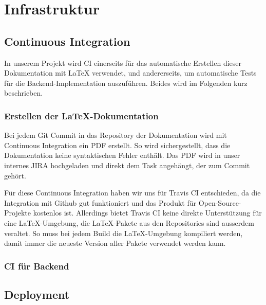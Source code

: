 
\section{Infrastruktur}
\label{Infrastruktur}

\subsection{Continuous Integration}
\label{Infrastruktur:Continuous Integration}

In unserem Projekt wird \ac{CI} einerseits für das automatische Erstellen dieser Dokumentation mit LaTeX verwendet, und andererseits, um automatische Tests für die Backend-Implementation auszuführen. Beides wird im Folgenden kurz beschrieben.

\subsubsection{Erstellen der LaTeX-Dokumentation}
\label{CI:Erstellen der LaTeX-Dokumentation}

Bei jedem Git Commit in das Repository der Dokumentation \cite{github:thesis} wird mit Continuous Integration ein PDF erstellt. So wird sichergestellt, dass die Dokumentation keine syntaktischen Fehler enthält. Das PDF wird in unser internes JIRA hochgeladen und direkt dem Task angehängt, der zum Commit gehört.

Für diese Continuous Integration haben wir uns für Travis CI \cite{travis-ci} entschieden, da die Integration mit Github gut funktioniert und das Produkt für Open-Source-Projekte kostenlos ist. Allerdings bietet Travis CI keine direkte Unterstützung für eine LaTeX-Umgebung, die LaTeX-Pakete aus den Repositories sind ausserdem veraltet. So muss bei jedem Build die LaTeX-Umgebung kompiliert werden, damit immer die neueste Version aller Pakete verwendet werden kann.


\subsubsection{CI für Backend}
\label{CI:CI für Backend}


\subsection{Deployment}
\label{Infrastruktur:Deployment}

